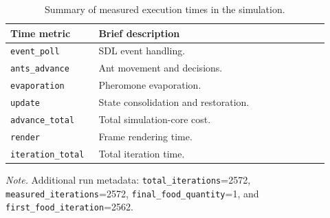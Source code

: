 \begin{table}[htbp]
\centering
\caption{Summary of measured execution times in the simulation.}
\label{tab:timing_summary}
\begin{tabular}{p{0.24\linewidth} p{0.68\linewidth}}
\hline
\textbf{Time metric} & \textbf{Brief description} \\
\hline
\texttt{event\_poll} & SDL event handling. \\
\texttt{ants\_advance} & Ant movement and decisions. \\
\texttt{evaporation} & Pheromone evaporation. \\
\texttt{update} & State consolidation and restoration. \\
\texttt{advance\_total} & Total simulation-core cost. \\
\texttt{render} & Frame rendering time. \\
\texttt{iteration\_total} & Total iteration time. \\
\hline
\end{tabular}
\end{table}

\begin{table}[!htbp]
\centering
\caption{Measured timing statistics for the non-vectorized implementation with 1 thread and 5000 ants.}
\label{tab:timing_summary_threads1_ants5000}
\scriptsize
\setlength{\tabcolsep}{2.8pt}
\renewcommand{\arraystretch}{1.08}
\par\vspace{2pt}\parbox{\columnwidth}{\raggedright\footnotesize\textit{Note.} Additional run metadata: \texttt{total\_iterations}=2572, \texttt{measured\_iterations}=2572, \texttt{final\_food\_quantity}=1, and \texttt{first\_food\_iteration}=2562.}
\end{table}


